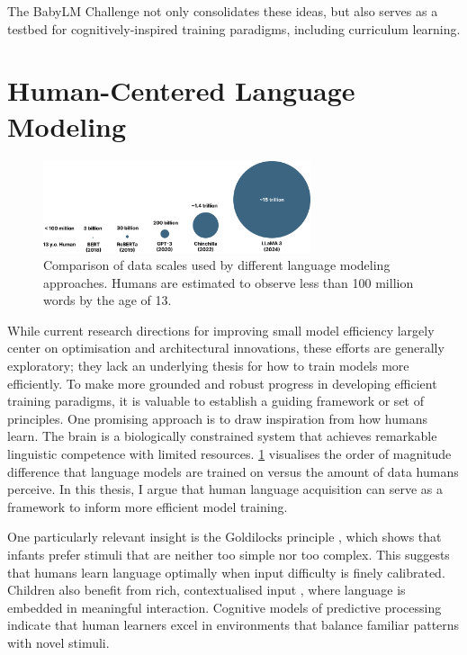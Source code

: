 The BabyLM Challenge not only consolidates these ideas, but also serves as a testbed for cognitively-inspired training paradigms, including curriculum learning.

\section{Human-Centered Language Modeling}

\begin{figure}[ht!]
    \centering
    \includegraphics[width=0.7\textwidth]{chapters/background/figures/data_comparison.pdf}
    \caption{Comparison of data scales used by different language modeling approaches. Humans are estimated to observe less than 100 million words by the age of 13.}
    \label{fig:data-comparison}
\end{figure}


While current research directions for improving small model efficiency largely center on optimisation and architectural innovations, these efforts are generally exploratory; they lack an underlying thesis for how to train models more efficiently. To make more grounded and robust progress in developing efficient training paradigms, it is valuable to establish a guiding framework or set of principles. One promising approach is to draw inspiration from how humans learn. The brain is a biologically constrained system that achieves remarkable linguistic competence with limited resources. \cref{fig:data-comparison} visualises the order of magnitude difference that language models are trained on versus the amount of data humans perceive. In this thesis, I argue that human language acquisition can serve as a framework to inform more efficient model training.

One particularly relevant insight is the Goldilocks principle \citep{kidd2012goldilocks}, which shows that infants prefer stimuli that are neither too simple nor too complex. This suggests that humans learn language optimally when input difficulty is finely calibrated. Children also benefit from rich, contextualised input \citep{bergelson2015early, weizman2001lexical}, where language is embedded in meaningful interaction. Cognitive models of predictive processing~\citep{caucheteux2023evidence} indicate that human learners excel in environments that balance familiar patterns with novel stimuli. 

